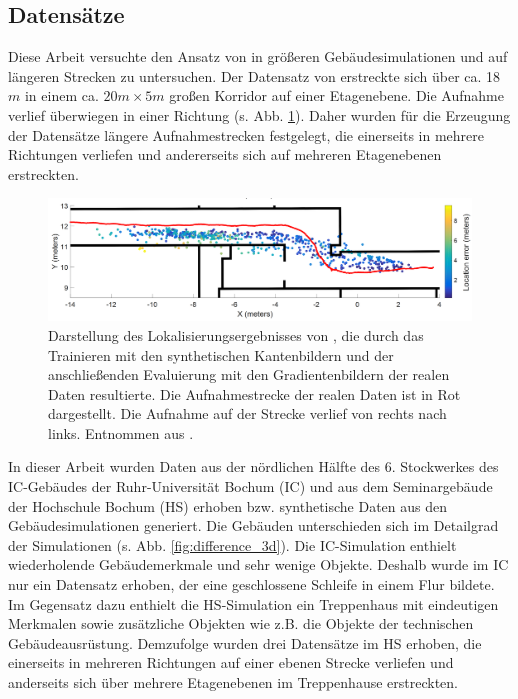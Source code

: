 \cleardoublepage



\subsection{Datensätze}
\label{subsec:datasets}
Diese Arbeit versuchte den Ansatz von \citet{acharyaBIMPoseNetIndoorCamera2019} in größeren Gebäudesimulationen und auf längeren Strecken zu untersuchen. Der Datensatz von \citet{acharyaBIMPoseNetIndoorCamera2019} erstreckte sich über ca. 18$m$ in einem ca. $20m \times 5m$ großen Korridor auf einer Etagenebene. Die Aufnahme verlief überwiegen in einer Richtung (s. Abb. \ref{fig:acharya_traj}). Daher wurden für die Erzeugung der Datensätze längere Aufnahmestrecken festgelegt, die einerseits in mehrere Richtungen verliefen und andererseits sich auf mehreren Etagenebenen erstreckten. 

\begin{figure}
	\centering
	\includegraphics[width=1.0\textwidth]{images/trajectories/acharya_traj.png}
	\caption{Darstellung des Lokalisierungsergebnisses von \citet{acharyaBIMPoseNetIndoorCamera2019}, die durch das Trainieren mit den synthetischen Kantenbildern und der anschließenden Evaluierung mit den Gradientenbildern der realen Daten resultierte. Die Aufnahmestrecke der realen Daten ist in Rot dargestellt. Die Aufnahme auf der Strecke verlief von rechts nach links. Entnommen aus \cite{acharyaBIMPoseNetIndoorCamera2019}.}
	\label{fig:acharya_traj}
\end{figure}




In dieser Arbeit wurden Daten aus der nördlichen Hälfte des 6. Stockwerkes des IC-Gebäudes der Ruhr-Universität Bochum (IC) und aus dem Seminargebäude der Hochschule Bochum (HS) erhoben bzw. synthetische Daten aus den Gebäudesimulationen generiert. Die Gebäuden unterschieden sich im Detailgrad der Simulationen (s. Abb. \ref{fig:difference_3d}). Die IC-Simulation enthielt wiederholende Gebäudemerkmale und sehr wenige Objekte. Deshalb wurde im IC nur ein Datensatz erhoben, der eine geschlossene Schleife in einem Flur bildete. Im Gegensatz dazu enthielt die HS-Simulation ein Treppenhaus mit eindeutigen Merkmalen sowie zusätzliche Objekten wie z.B. die Objekte der technischen Gebäudeausrüstung. Demzufolge wurden drei Datensätze im HS erhoben, die einerseits in mehreren Richtungen auf einer ebenen Strecke verliefen und anderseits sich über mehrere Etagenebenen im Treppenhause erstreckten.




